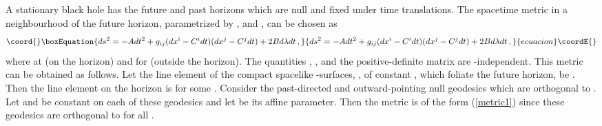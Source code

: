\documentclass[a4paper,12pt]{article}
\begin{document}
A stationary black hole has the future and past horizons 
which are null and fixed under time translations. 
The spacetime metric in a neighbourhood of 
the future horizon, parametrized by \coordHE{}  \coordHE{},
\myHighlight{$\lambda$}\coordHE{} and \coordHE{}, can be chosen as
\begin{equation}\coord{}\boxEquation{
ds^2 = -Adt^2 + g_{ij}(dx^i - C^i dt)(dx^j - C^jdt) + 2Bd\lambda dt\,,
\label{metric1}
}{
ds^2 = -Adt^2 + g_{ij}(dx^i - C^i dt)(dx^j - C^jdt) + 2Bd\lambda dt\,,
}{ecuacion}\coordE{}\end{equation}
where \coordHE{} at \coordHE{} (on the horizon) and 
\coordHE{} for \coordHE{} (outside the
horizon).  The quantities
\coordHE{}, \coordHE{}, \coordHE{} and the positive-definite matrix 
\coordHE{} are \coordHE{}-independent. 
This metric can be obtained as follows.  Let the line element of the compact 
spacelike 
\coordHE{}-surfaces, \coordHE{}, of constant \coordHE{}, which foliate the future horizon, be
\coordHE{}.  Then the line element 
on the horizon is \coordHE{} for some \coordHE{}.
Consider the past-directed and outward-pointing null geodesics which 
are orthogonal to \coordHE{}.
Let \coordHE{} and \coordHE{} be constant on each of these geodesics
and let \myHighlight{$\lambda$}\coordHE{} be its affine parameter. Then the metric is of the form 
(\ref{metric1}) since these geodesics are orthogonal to
\coordHE{} for all \myHighlight{$\lambda$}\coordHE{}.
\end{document}
